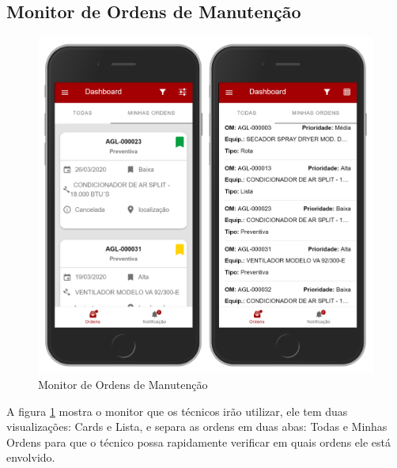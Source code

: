 \subsection{Monitor de Ordens de Manutenção}
\begin{figure}[H]
	\caption{\label{mobile-monitor}Monitor de Ordens de Manutenção}
	\begin{center}
		\includegraphics[scale=0.55]{./Figuras/agil.it/mobile-monitor.jpg}
	\end{center}
\end{figure}

A figura \ref{mobile-monitor} mostra o monitor que os técnicos irão utilizar, ele tem duas visualizações: Cards e Lista, e separa as ordens em duas abas: Todas e Minhas Ordens para que o técnico possa rapidamente verificar em quais ordens ele está envolvido.

